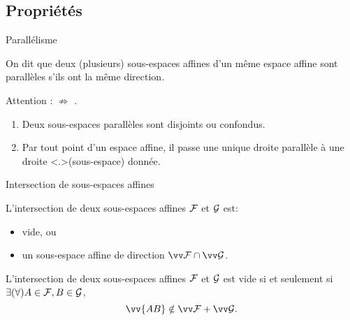 \documentclass{m53beamer}
\begin{document}
\subsection{Propriétés}
  \begin{frame}{Parallélisme}
    \begin{definition}
      On dit que deux (plusieurs) sous-espaces affines d'un même espace affine sont
      \alert{parallèles} s'ils ont la même direction.\pause{}
    \end{definition}\pause
    Attention :  $\not\Rightarrow$ .\pause
    \begin{proposition}
      \begin{enumerate}[<+->]
        \item Deux sous-espaces parallèles sont disjoints ou confondus.
        \item Par tout point d'un espace affine, il passe une unique droite \uncover<+>{(sous-espace)} parallèle à une droite  donnée.
      \end{enumerate}
    \end{proposition}
  \end{frame}
  \begin{frame}{Intersection de sous-espaces affines}
    \begin{proposition}
      L'intersection de deux sous-espaces affines $\mathcal{F}$ et $\mathcal{G}$ est:
      \begin{itemize}\pause
          \item vide\pause, ou
          \item un sous-espace affine de direction $\ev{F}\cap\ev{G}$.
        \end{itemize}
    \end{proposition}\pause
    \begin{proposition}
      L'intersection de deux sous-espaces affines $\mathcal{F}$ et $\mathcal{G}$ est vide si et seulement si $\exists(\forall) A \in \mathcal{F}, B \in \mathcal{G}$,
      $$
        \vv{AB} \notin \ev{F}+\ev{G}.
      $$
    \end{proposition}
  \end{frame}
\end{document}
